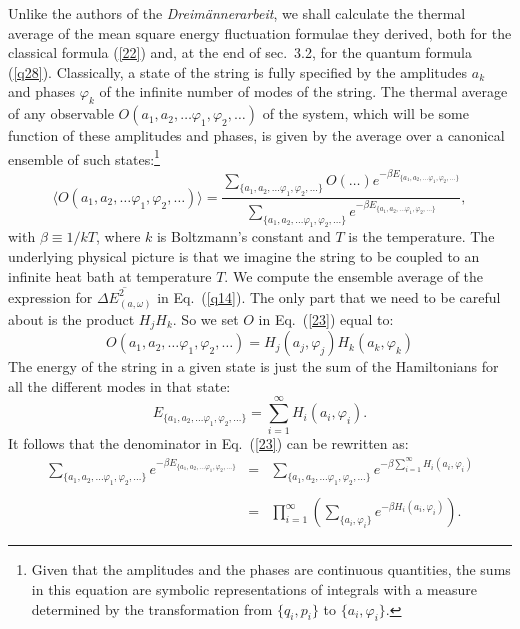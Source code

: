 \documentclass[12pt]{elsart}
\begin{document}
Unlike the authors of the {\it Dreim\"annerarbeit}, we shall calculate the thermal average of the mean square energy fluctuation formulae they derived, both for the classical formula  (\ref{22})  and, at the end of sec.\ 3.2, for the quantum formula (\ref{q28}). Classically, a state of the string is fully specified by the amplitudes $a_k$ and phases $\varphi_k$ of the infinite number of modes of the string. The thermal average of any observable $O(a_1, a_2, \ldots \varphi_1, \varphi_2, \ldots)$ of the system, which will be some function of these amplitudes and phases, is given by the average over a canonical ensemble of such states:\footnote{Given that the amplitudes and the phases are continuous quantities, the sums in this equation are symbolic representations of integrals with a measure determined by the transformation from $\{ q_i, p_i \}$ to $\{ a_i,  \varphi_i\}$.}
\begin{equation}
\langle O(a_1, a_2, \ldots \varphi_1, \varphi_2, \ldots)  \rangle
= \frac{\displaystyle{\sum_{\{ a_1, a_2, \ldots \varphi_1, \varphi_2, \ldots\}} O(\ldots) e^{- \displaystyle{\beta E_{\{ a_1, a_2, \ldots \varphi_1, \varphi_2, \ldots\}}}}}}{
\displaystyle{\sum_{\{ a_1, a_2, \ldots \varphi_1, \varphi_2, \ldots\}} e^{- \displaystyle{\beta E_{\{ a_1, a_2, \ldots \varphi_1, \varphi_2, \ldots\}}}}}},
\label{23}
\end{equation} 
with $\beta \equiv 1/kT$, where $k$ is Boltzmann's constant and $T$ is the temperature. The underlying physical picture is that we imagine the string to be coupled to an infinite heat bath at temperature $T$. We compute the ensemble average of the expression for $\overline{\Delta E_{(a, \omega)}^2}$ in Eq.\ (\ref{q14}). The only part that we need to be careful about is the product $H_j H_k$. So we set $O$ in Eq.\ (\ref{23}) equal to:
\begin{equation}
O(a_1, a_2, \ldots \varphi_1, \varphi_2, \ldots) = H_j (a_j, \varphi_j) H_k (a_k, \varphi_k)
\label{24}
\end{equation}
The energy of the string in a given state is just the sum of the Hamiltonians for all the different modes in that state:
\begin{equation}
E_{\{ a_1, a_2, \ldots \varphi_1, \varphi_2, \ldots\}} = \sum_{i=1}^\infty H_i(a_i, \varphi_i).
\label{25}
\end{equation} 
It follows that the denominator in Eq.\ (\ref{23}) can be rewritten as:
\begin{eqnarray}
\displaystyle{\sum_{\{ a_1, a_2, \ldots \varphi_1, \varphi_2, \ldots\}} e^{- \displaystyle{\beta E_{\{ a_1, a_2, \ldots \varphi_1, \varphi_2, \ldots\}}}}} & = & 
\displaystyle{\sum_{\{ a_1, a_2, \ldots \varphi_1, \varphi_2, \ldots\}} e^{- \displaystyle{\beta \sum_{i=1}^\infty H_i(a_i, \varphi_i)}}}
\nonumber \\
 & & \label{26} \\
 & = & \prod_{i=1}^\infty \left( \sum_{\{ a_i, \varphi_i \}}
e^{ \displaystyle{ -\beta H_i(a_i, \varphi_i) } } \right).\nonumber
\end{eqnarray}
\end{document}
